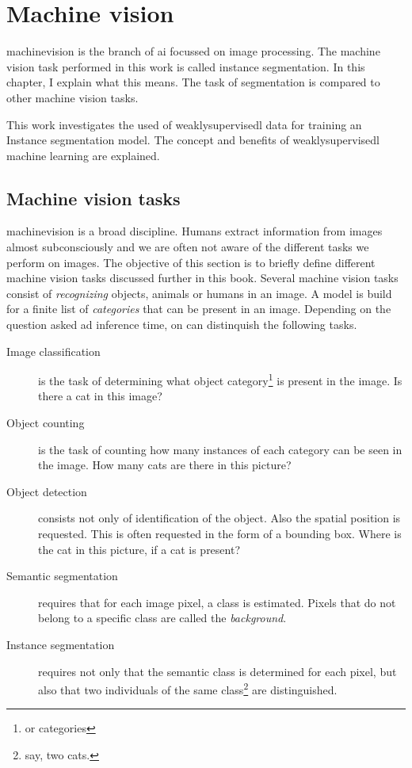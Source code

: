 \chapter{Machine vision}

\Gls{machinevision} is the branch of \Gls{ai} focussed on image processing.
The machine vision task performed in this work is called instance \Gls{segmentation}.
In this chapter, I explain what this means. 
The task of segmentation is compared to other machine vision tasks.

This work investigates the used of \Gls{weaklysupervisedl} data for training an Instance segmentation model. 
The concept and benefits of \Gls{weaklysupervisedl} machine learning are explained.

\section{Machine vision tasks \label{sec:machinevisiontasks}}

\Gls{machinevision} is a broad discipline. 
Humans extract information from images almost subconsciously and we are often not aware of the different tasks we perform on images.
The objective of this section is to briefly define different machine vision tasks discussed further in this book. 
Several machine vision tasks consist of \textit{recognizing} objects, animals or humans in an image.
A model is build for a finite list of \textit{categories} that can be present in an image.
Depending on the question asked ad inference time, on can distinquish the following tasks.

\begin{description}
    \item[Image classification] is the task of determining what object category\footnote{or categories} is present in the image. Is there a cat in this image?
    \item[Object counting] is the task of counting how many instances of each category can be seen in the image. How many cats are there in this picture? 
    \item[Object detection] consists not only of identification of the object. Also the spatial position is requested. This is often requested in the form of a bounding box. Where is the cat in this picture, if a cat is present?
    \item[Semantic segmentation] requires that for each image pixel, a class is estimated. Pixels that do not belong to a specific class are called the \textit{background}.
    \item[Instance segmentation] requires not only that the semantic class is determined for each pixel, but also that two individuals of the same class\footnote{say, two cats.} are distinguished.   
\end{description}

